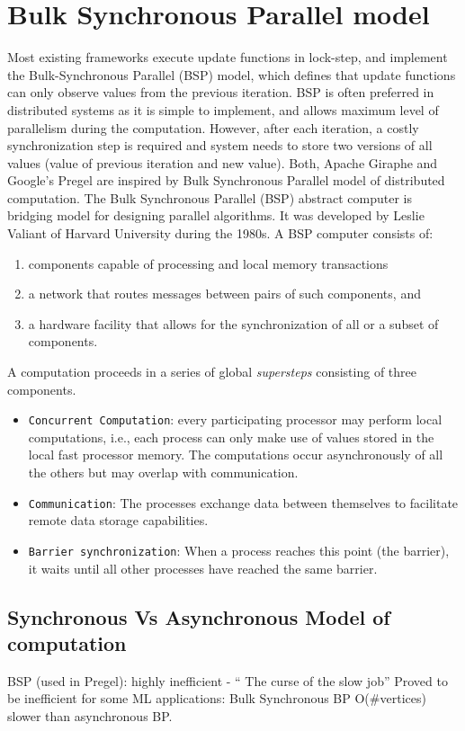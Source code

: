 \documentclass[letterpaper,twocolumn,10pt]{article}
\begin{document}
\section{Bulk Synchronous Parallel model}
\label{sec:bsp}
Most existing frameworks execute update functions in lock-step, and implement the Bulk-Synchronous Parallel (BSP) model, which defines that update functions can only observe values from the previous iteration. BSP is often preferred in distributed systems as it is simple to implement, and allows maximum level of parallelism during the computation. However, after each iteration, a costly synchronization step is required and system needs to store two versions of all values (value of previous iteration and new value).
Both, Apache Giraphe and Google's Pregel are inspired by Bulk Synchronous Parallel model of distributed computation.
The Bulk Synchronous Parallel (BSP) abstract computer is bridging model for designing parallel algorithms. It was developed by Leslie Valiant of Harvard University during the 1980s. A BSP computer consists of:
\begin{enumerate}
\item components capable of processing and local memory transactions
\item a network that routes messages between pairs of such components, and
\item a hardware facility that allows for the synchronization of all or a subset of components.
\end{enumerate}
A computation proceeds in a series of global \textit{supersteps} consisting of three components.
\begin{itemize}
\item {\tt Concurrent Computation}: every participating processor may perform local computations, i.e., each process can only make use of values stored in the local fast processor memory. The computations occur asynchronously of all the others but may overlap with communication.
\item {\tt Communication}: The processes exchange data between themselves to facilitate remote data storage capabilities.
\item {\tt Barrier synchronization}: When a process reaches this point (the barrier), it waits until all other processes have reached the same barrier.
\end{itemize}

\subsection{Synchronous Vs Asynchronous Model of computation}
BSP (used in Pregel): highly inefficient - `` The curse of the slow job''
Proved to be inefficient for some ML applications:
	Bulk Synchronous BP O(\#vertices) slower than asynchronous BP.

{\footnotesize 
}


\theendnotes
\end{document}
